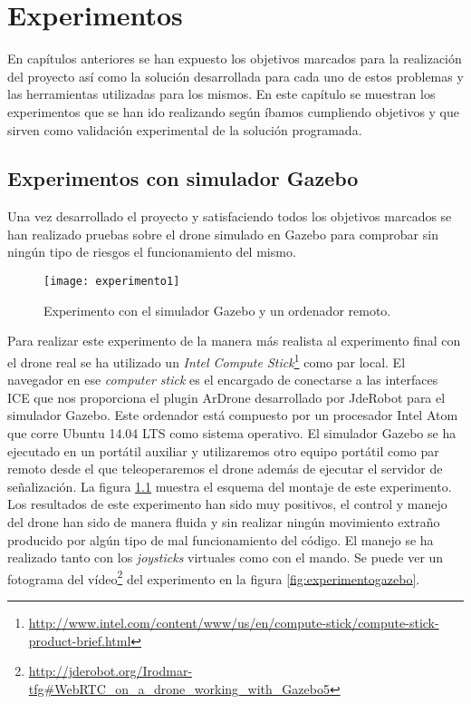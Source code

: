 \chapter{Experimentos}

En capítulos anteriores se han expuesto los objetivos marcados para la realización del proyecto así como la solución desarrollada para cada uno de estos problemas y las herramientas utilizadas para los mismos. En este capítulo se muestran los experimentos que se han ido realizando según íbamos cumpliendo objetivos y que sirven como validación experimental de la solución programada.\\

\section{Experimentos con simulador Gazebo}

Una vez desarrollado el proyecto y satisfaciendo todos los objetivos marcados se han realizado pruebas sobre el drone simulado en Gazebo para comprobar sin ningún tipo de riesgos el funcionamiento del mismo.\\

\begin{figure}[h!]
\centering
\texttt{[image: experimento1]}
\caption{Experimento con el simulador Gazebo y un ordenador remoto.}
\label{fig:esquemaexperimento1}
\end{figure}

Para realizar este experimento de la manera más realista al experimento final con el drone real se ha utilizado un \emph{Intel Compute Stick}\footnote{\url{http://www.intel.com/content/www/us/en/compute-stick/compute-stick-product-brief.html}} como par local. El navegador en ese \emph{computer stick} es el encargado de conectarse a las interfaces ICE que nos proporciona el plugin ArDrone desarrollado por JdeRobot para el simulador Gazebo. Este ordenador está compuesto por un procesador Intel Atom que corre Ubuntu 14.04 LTS como sistema operativo. El simulador Gazebo se ha ejecutado en un portátil auxiliar y utilizaremos otro equipo portátil como par remoto desde el que teleoperaremos el drone además de ejecutar el servidor de señalización. La figura \ref{fig:esquemaexperimento1} muestra el esquema del montaje de este experimento. \\

Los resultados de este experimento han sido muy positivos, el control y manejo del drone han sido de manera fluida y sin realizar ningún movimiento extraño producido por algún tipo de mal funcionamiento del código. El manejo se ha realizado tanto con los \emph{joysticks} virtuales como con el mando. Se puede ver un fotograma del vídeo\footnote{\url{http://jderobot.org/Irodmar-tfg#WebRTC_on_a_drone_working_with_Gazebo5}} del experimento en la figura \ref{fig:experimentogazebo}.\\

